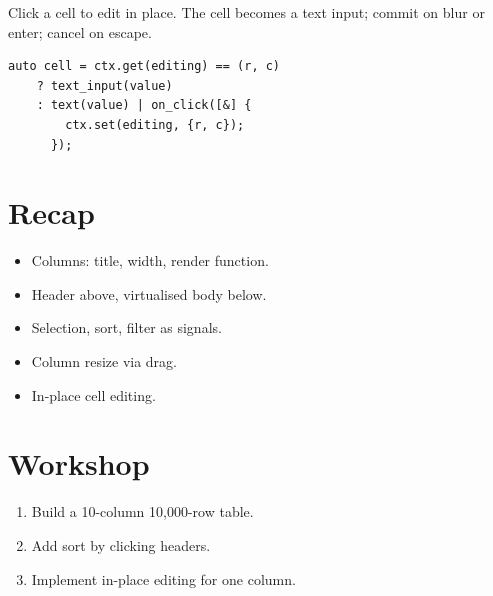 Click a cell to edit in place. The cell becomes a text
input; commit on blur or enter; cancel on escape.

\begin{lstlisting}
auto cell = ctx.get(editing) == (r, c)
    ? text_input(value)
    : text(value) | on_click([&] {
        ctx.set(editing, {r, c});
      });
\end{lstlisting}

\section{Recap}

\begin{recap}
\begin{itemize}[leftmargin=*]
  \item Columns: title, width, render function.
  \item Header above, virtualised body below.
  \item Selection, sort, filter as signals.
  \item Column resize via drag.
  \item In-place cell editing.
\end{itemize}
\end{recap}

\section*{Workshop}

\begin{enumerate}[leftmargin=*]
  \item Build a 10-column 10,000-row table.
  \item Add sort by clicking headers.
  \item Implement in-place editing for one column.
\end{enumerate}
